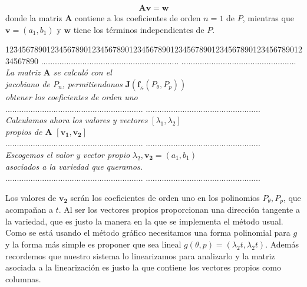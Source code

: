 \begin{eqnarray}
\mathbf{A}\mathbf{v}=\mathbf{w}
\label{lineal A}
\end{eqnarray}
donde la matriz $\mathbf{A}$ contiene a los coeficientes de  orden $n=1$  de $P$, mientras que $\textbf{v}=(a_{1},b_{1})$ y $\textbf{w}$ tiene los términos independientes de $P$. 
\begin{center}

  
\begin{tabbing}
12\=34567890123456789012345678901234567890123456\=7890123456789012345678901234567890\kill%
\>............................................................  \>..................................................\\
\>\textsl{La matriz $\mathbf{A}$ se calculó con el } \>  \\
\>\textsl{jacobiano de $P_{n}$, permitiendonos } \> $\mathbf{J}(\mathbf{f}_{\kappa}(P_{\theta},P_{p}))$  \\
\>\textsl{obtener los coeficientes de orden uno  } \> \\


\>............................................................  \>..................................................\\
\>\textsl{Calculamos ahora los valores y vectores } \> $[\lambda_{1},\lambda_{2}]$\\
\>\textsl{propios de $\mathbf{A}$ } \> $[\mathbf{v_{1}},\mathbf{v_{2}}]$\\
\>............................................................  \>..................................................\\
\>\textsl{Escogemos el valor y vector propio }\> $\lambda_{2},\mathbf{v_{2}}=(a_{1},b_{1})$\\
\>\textsl{asociados a la variedad que queramos.} \> \\

\>............................................................  \>..................................................\\
\end{tabbing}
\end{center}
Los valores de $\mathbf{v_{2}}$ serán los coeficientes de orden uno en los polinomios $P_{\theta},P_{p}$, que acompañan a $t$. Al ser los vectores propios proporcionan una dirección tangente a la variedad, que es justo la manera en la que se implementa el método usual.\\

Como se está usando el método gráfico necesitamos una forma polinomial para $g$ y la forma más simple es proponer que sea lineal $g(\theta,p)=(\lambda_{2}t,\lambda_{2}t)$. Además recordemos que nuestro sistema lo linearizamos para analizarlo y la matriz asociada a la linearización es justo la que contiene los vectores propios como columnas.\\

